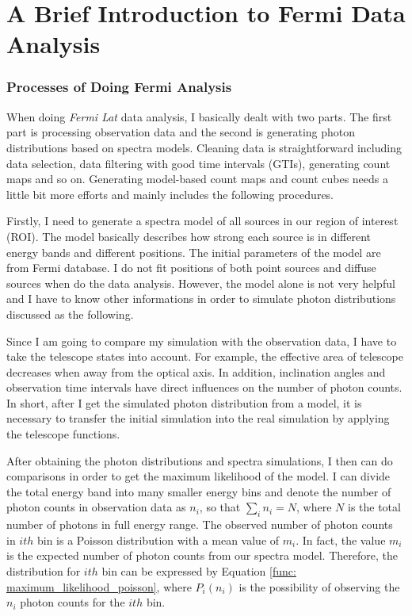 \documentclass[12pt]{report}
\begin{document}
      \section{A Brief Introduction to Fermi Data Analysis}

        \subsubsection{Processes of Doing Fermi Analysis}
          When doing \textit{Fermi Lat} data analysis, I basically dealt with two parts. The 
          first part is processing observation data and the second is generating photon 
          distributions based on spectra models. Cleaning data is straightforward including data 
          selection, data filtering with good time intervals (GTIs), generating count maps 
          and so on. Generating model-based count maps and count cubes needs a little bit 
          more efforts and mainly includes the following procedures. 

          Firstly, I need to generate a spectra model of all sources in our region of 
          interest (ROI). The model basically describes how strong each source is in 
          different energy bands and different positions. The initial parameters of the 
          model are from Fermi database. I do not fit positions of both point sources and 
          diffuse sources when do the data analysis. 
          However, the model alone is not very 
          helpful and I have to know other informations in order to simulate photon 
          distributions discussed as the following.

          Since I am going to compare my simulation with the observation data, I have to take 
          the telescope states into account. For example, the effective area of telescope 
          decreases when away from the optical axis. In addition, inclination angles and 
          observation time intervals have direct influences on the number of photon counts. 
          In short, after I get the simulated photon distribution from a model, it is 
          necessary to transfer the initial simulation into the real simulation by applying 
          the telescope functions. 
          
          After obtaining the photon distributions and spectra simulations, I then can do 
          comparisons in order to get the maximum likelihood of the model. I can divide the 
          total energy band into many smaller energy bins and denote
          the number of photon counts in observation data as $n_{i}$, so that 
          $\sum_{i}^{}n_{i} = N$, where $N$ is the total number of photons in full energy range. 
          The observed number of photon counts in $ith$ bin is a Poisson distribution with a 
          mean value of $m_{i}$. In fact, the value $m_{i}$ is the expected number of photon counts 
          from our spectra model. Therefore, the distribution for $ith$
          bin can be expressed by Equation \ref{func: maximum_likelihood_poisson}, where 
          $P_{i}\left(n_{i}\right)$ is the possibility of observing the $n_{i}$ photon counts 
          for the $ith$ bin. 
\end{document}

